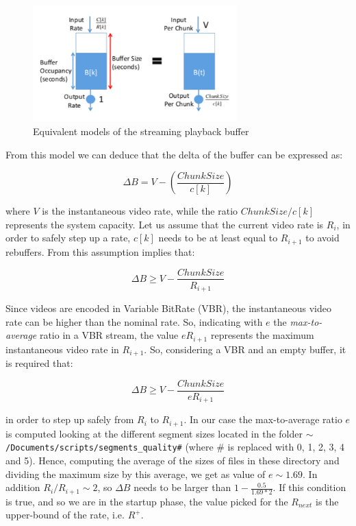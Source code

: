 \documentclass[a4paper]{report}
\begin{document}
\begin{figure}[H]
  \begin{center}
    \includegraphics[width=0.7\textwidth]{modelplaybackbuffer.png}
  \end{center}
  \caption{Equivalent models of the streaming playback buffer ~\cite{Huang:2014:BAR:2740070.2626296}}\label{fig:playback}
\end{figure}

From this model we can deduce that the delta of the buffer can be expressed as:

\[
\Delta B = V - (\frac{ChunkSize}{c[k]})
\]

where $V$ is the instantaneous video rate, while the ratio $ChunkSize/c[k]$ represents the system capacity.
Let us assume that the current video rate is $R_i$, in order to safely step up a rate, $c[k]$ needs to be at least equal to $R_{i+1}$ to avoid rebuffers. From this assumption implies that:

\[
\Delta B \geq V - \frac{ChunkSize}{R_{i+1}}
\]

Since videos are encoded in Variable BitRate (VBR), the instantaneous video rate can be higher than the nominal rate. So, indicating with $e$ the \textit{max-to-average} ratio in a VBR stream, the value $eR_{i+1}$ represents the maximum instantaneous video rate in $R_{i+1}$. So, considering a VBR and an empty buffer, it is required that:

\[
\Delta B \geq V - \frac{ChunkSize}{eR_{i+1}}
\]

in order to step up safely from $R_{i}$ to $R_{i+1}$.
In our case the max-to-average ratio $e$ is computed looking at the different segment sizes located in the folder \texttt{$\sim$/Documents/scripts/segments\_quality\#} (where \# is replaced with 0, 1, 2, 3, 4 and 5). Hence, computing the average of the sizes of files in these directory and dividing the maximum size by this average, we get as value of $e \sim 1.69$. In addition $R_{i} / R_{i+1} \sim 2$, so $\Delta B $ needs to be larger than $1 - \frac{0.5}{1.69*2}$. If this condition is true, and so we are in the startup phase, the value picked for the $R_{next}$ is the upper-bound of the rate, i.e. $R^+$. 
\end{document}
